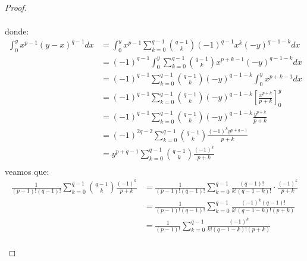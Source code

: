 \documentclass[12pt]{report}
\theoremstyle{largebreak}
\begin{document}
\begin{proof}
\begin{itemize}
\begin{equation*}
\begin{split}
                \end{split}
            \end{equation*}
            donde:
            \begin{equation*}
                \begin{split}
                    \int_{0}^y x^{p-1}(y-x)^{q-1}dx&=\int_0^yx^{p-1}\sum_{k=0}^{q-1}\binom{q-1}{k}(-1)^{q-1}x^k(-y)^{q-1-k}dx\\
                    &=(-1)^{q-1}\int_0^y\sum_{k=0}^{q-1}\binom{q-1}{k}x^{p+k-1}(-y)^{q-1-k}dx\\
                    &=(-1)^{q-1}\sum_{k=0}^{q-1}\binom{q-1}{k}(-y)^{q-1-k}\int_0^yx^{p+k-1}dx\\
                    &=(-1)^{q-1}\sum_{k=0}^{q-1}\binom{q-1}{k}(-y)^{q-1-k}\left[\frac{x^{p+k}}{p+k} \right]_0^y \\
                    &=(-1)^{q-1}\sum_{k=0}^{q-1}\binom{q-1}{k}(-y)^{q-1-k}\frac{y^{p+k}}{p+k} \\
                    &=(-1)^{2q-2}\sum_{k=0}^{q-1}\binom{q-1}{k}\frac{(-1)^ky^{p+q-1}}{p+k} \\
                    &=y^{p+q-1}\sum_{k=0}^{q-1}\binom{q-1}{k}\frac{(-1)^k}{p+k} \\
                \end{split}
            \end{equation*}
            veamos que:
            \begin{equation*}
                \begin{split}
                    \frac{1}{(p-1)!(q-1)!}\sum_{k=0}^{q-1}\binom{q-1}{k}\frac{(-1)^k}{p+k}
                    &=\frac{1}{(p-1)!(q-1)!}\sum_{k=0}^{q-1}\frac{(q-1)!}{k!(q-1-k)!}\cdot\frac{(-1)^k}{p+k}\\
                    &=\frac{1}{(p-1)!(q-1)!}\sum_{k=0}^{q-1}\frac{(-1)^k(q-1)!}{k!(q-1-k)!(p+k)} \\
                    &=\frac{1}{(p-1)!}\sum_{k=0}^{q-1}\frac{(-1)^k}{k!(q-1-k)!(p+k)} \\
                \end{split}
            \end{equation*}
        \end{itemize}
    \end{proof}
\end{document}
